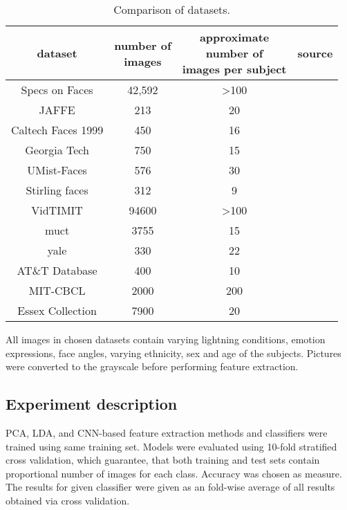 \documentclass[a4paper, 10 pt, conference]{ieeeconf}
\begin{document}
\begin{table}[!h]
    \centering
    \caption{Comparison of datasets.}
    \begin{tabular}{|c|c|c|c|}
         \hline
         dataset & \thead{number of\\ images} & \thead{approximate\\ number of\\ images per subject} & source \\
         \hline
         Specs on Faces & 42,592 & >100 & \cite{afifi2017afif4} \\
         \hline
         JAFFE & 213 & 20 & \cite{JAFFE} \\
         \hline
         Caltech Faces 1999 & 450 & 16 & \cite{CaltechFaces} \\
         \hline
         Georgia Tech & 750 & 15 & \cite{georgia_tech_face_database} \\
         \hline
         UMist-Faces & 576 & 30 & \cite{UMist-Faces} \\
         \hline
         Stirling faces & 312 & 9 & \cite{Stirling_faces} \\
         \hline
         VidTIMIT & 94600 & >100 & \cite{VidTIMIT} \\
         \hline
         muct & 3755 & 15 & \cite{Milborrow10} \\
         \hline
         yale & 330 & 22 & \cite{yale} \\
         \hline
         AT\&T Database & 400 & 10 & \cite{TheDatabaseOfFaces} \\
         \hline
         MIT-CBCL  & 2000 & 200 & \cite{FaceRecognitionDatabase} \\
         \hline
         Essex Collection & 7900 & 20 & \cite{essex} \\
          \hline
    \end{tabular}
    \label{tab:datasets}
\end{table}

All images in chosen datasets contain varying lightning conditions, emotion expressions, face angles, varying ethnicity, sex and age of the subjects. Pictures were converted to the grayscale before performing feature extraction. 

\subsection{Experiment description}

PCA, LDA, and CNN-based feature extraction methods and classifiers were trained using same training set. Models were evaluated using 10-fold stratified cross validation, which guarantee, that both training and test sets contain proportional number of images for each class. Accuracy was chosen as measure. The results for given classifier were given as an fold-wise average of all results obtained via cross validation.
\end{document}
